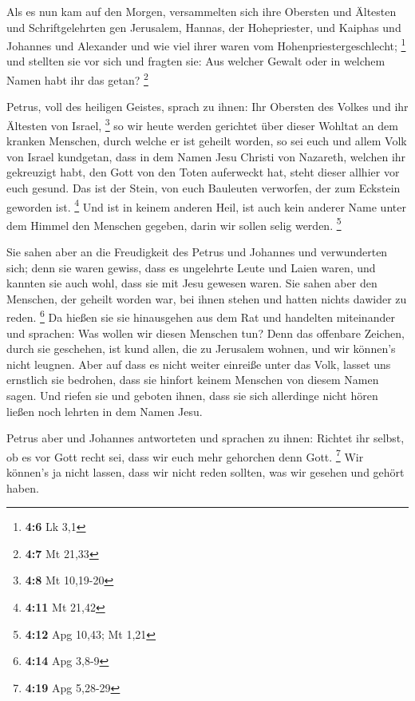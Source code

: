  Als es nun kam auf den Morgen, versammelten sich ihre
Obersten und Ältesten und Schriftgelehrten gen Jerusalem, 
Hannas, der Hohepriester, und Kaiphas und Johannes und Alexander und wie
viel ihrer waren vom Hohenpriestergeschlecht; \footnote{\textbf{4:6} Lk
  3,1}  und stellten sie vor sich und fragten sie: Aus
welcher Gewalt oder in welchem Namen habt ihr das getan? \footnote{\textbf{4:7}
  Mt 21,33}

 Petrus, voll des heiligen Geistes, sprach zu ihnen: Ihr
Obersten des Volkes und ihr Ältesten von Israel, \footnote{\textbf{4:8}
  Mt 10,19-20}  so wir heute werden gerichtet über dieser
Wohltat an dem kranken Menschen, durch welche er ist geheilt worden,
 so sei euch und allem Volk von Israel kundgetan, dass in
dem Namen Jesu Christi von Nazareth, welchen ihr gekreuzigt habt, den
Gott von den Toten auferweckt hat, steht dieser allhier vor euch gesund.
 Das ist der Stein, von euch Bauleuten verworfen, der zum
Eckstein geworden ist. \footnote{\textbf{4:11} Mt 21,42} 
Und ist in keinem anderen Heil, ist auch kein anderer Name unter dem
Himmel den Menschen gegeben, darin wir sollen selig werden. \footnote{\textbf{4:12}
  Apg 10,43; Mt 1,21}

 Sie sahen aber an die Freudigkeit des Petrus und
Johannes und verwunderten sich; denn sie waren gewiss, dass es
ungelehrte Leute und Laien waren, und kannten sie auch wohl, dass sie
mit Jesu gewesen waren.  Sie sahen aber den Menschen, der
geheilt worden war, bei ihnen stehen und hatten nichts dawider zu reden.
\footnote{\textbf{4:14} Apg 3,8-9}  Da hießen sie sie
hinausgehen aus dem Rat und handelten miteinander und sprachen:
 Was wollen wir diesen Menschen tun? Denn das offenbare
Zeichen, durch sie geschehen, ist kund allen, die zu Jerusalem wohnen,
und wir können's nicht leugnen.  Aber auf dass es nicht
weiter einreiße unter das Volk, lasset uns ernstlich sie bedrohen, dass
sie hinfort keinem Menschen von diesem Namen sagen.  Und
riefen sie und geboten ihnen, dass sie sich allerdinge nicht hören
ließen noch lehrten in dem Namen Jesu.

 Petrus aber und Johannes antworteten und sprachen zu
ihnen: Richtet ihr selbst, ob es vor Gott recht sei, dass wir euch mehr
gehorchen denn Gott. \footnote{\textbf{4:19} Apg 5,28-29}
 Wir können's ja nicht lassen, dass wir nicht reden
sollten, was wir gesehen und gehört haben.

